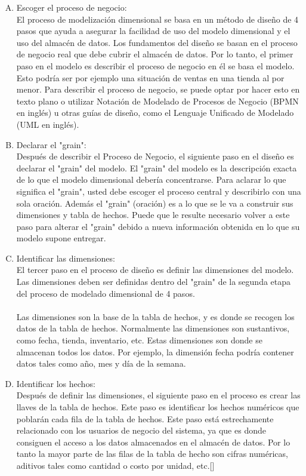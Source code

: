 \documentclass[11pt,a4paper]{article}
\begin{document}
		\begin{enumerate}[A.]
			\item Escoger el proceso de negocio:\\
			El proceso de modelización dimensional se basa en un método de diseño de 4 pasos que ayuda a asegurar la facilidad de uso del modelo dimensional y el uso del almacén de datos. Los fundamentos del diseño se basan en el proceso de negocio real que debe cubrir el almacén de datos. Por lo tanto, el primer paso en el modelo es describir el proceso de negocio en él se basa el modelo. Esto podría ser por ejemplo una situación de ventas en una tienda al por menor. Para describir el proceso de negocio, se puede optar por hacer esto en texto plano o utilizar Notación de Modelado de Procesos de Negocio (BPMN en inglés) u otras guías de diseño, como el Lenguaje Unificado de Modelado (UML en inglés).
			
			\item Declarar el "grain":\\
			Después de describir el Proceso de Negocio, el siguiente paso en el diseño es declarar el "grain" del modelo. El "grain" del modelo es la descripción exacta de lo que el modelo dimensional debería concentrarse. Para aclarar lo que significa el "grain", usted debe escoger el proceso central y describirlo con una sola oración. Además el "grain" (oración) es a lo que se le va a construir sus dimensiones y tabla de hechos. Puede que le resulte necesario volver a este paso para alterar el "grain" debido a nueva información obtenida en lo que su modelo supone entregar.
			
			\item Identificar las dimensiones:\\
			El tercer paso en el proceso de diseño es definir las dimensiones del modelo. Las dimensiones deben ser definidas dentro del "grain" de la segunda etapa del proceso de modelado dimensional de 4 pasos.\\
			 \\
			 Las dimensiones son la base de la tabla de hechos, y es donde se recogen los datos de la tabla de hechos. Normalmente las dimensiones son sustantivos, como fecha, tienda, inventario, etc. Estas dimensiones son donde se almacenan todos los datos. Por ejemplo, la dimensión fecha podría contener datos tales como año, mes y día de la semana.
			
			\item Identificar los hechos:\\
			Después de definir las dimensiones, el siguiente paso en el proceso es crear las llaves de la tabla de hechos. Este paso es identificar los hechos numéricos que poblarán cada fila de la tabla de hechos. Este paso está estrechamente relacionado con los usuarios de negocio del sistema, ya que es donde consiguen el acceso a los datos almacenados en el almacén de datos. Por lo tanto la mayor parte de las filas de la tabla de hecho son cifras numéricas, aditivos tales como cantidad o costo por unidad, etc.[\cite{cedeno2006modelo}]
			
		\end{enumerate}
	
\end{document}
